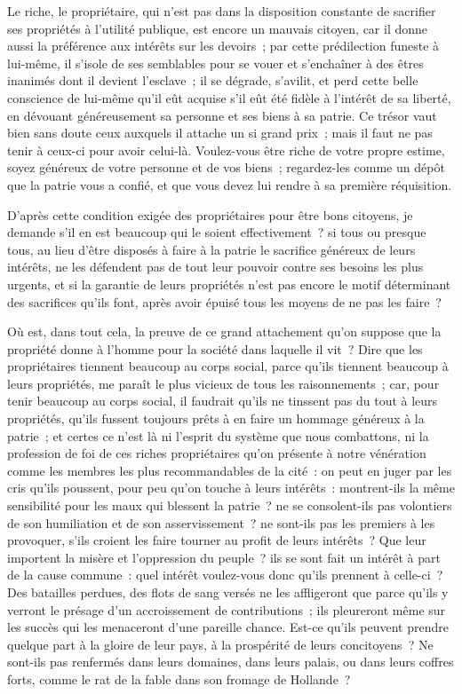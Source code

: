 \documentclass[french,twoside]{book} %
\begin{document}
Le riche, le propriétaire, qui n’est pas dans la disposition constante de sacrifier ses propriétés à l’utilité publique, est encore un mauvais citoyen, car il donne aussi la préférence aux intérêts sur les devoirs ; par cette prédilection funeste à lui-même, il s’isole de ses semblables pour se vouer et s’enchaîner à des êtres inanimés dont il devient l’esclave ; il se dégrade, s’avilit, et perd cette belle conscience de lui-même qu’il eût acquise s’il eût été fidèle à l’intérêt de sa liberté, en dévouant généreusement sa personne et ses biens à sa patrie. Ce trésor vaut bien sans doute ceux auxquels il attache un si grand prix ; mais il faut ne pas tenir à ceux-ci pour avoir celui-là. Voulez-vous être riche de votre propre estime, soyez généreux de votre personne et de vos biens ; regardez-les comme un dépôt que la patrie vous a confié, et que vous devez lui rendre à sa première réquisition.\par
D’après cette condition exigée des propriétaires pour être bons citoyens, je demande s’il en est beaucoup qui le soient effectivement ? si tous ou presque tous, au lieu d’être disposés à faire à la patrie le sacrifice généreux de leurs intérêts, ne les défendent pas de tout leur pouvoir contre ses besoins les plus urgents, et si la garantie de leurs propriétés n’est pas encore le motif déterminant des sacrifices qu’ils font, après avoir épuisé tous les moyens de ne pas les faire ?\par
Où est, dans tout cela, la preuve de ce grand attachement qu’on suppose que la propriété donne à l’homme pour la société dans laquelle il vit ? Dire que les propriétaires tiennent beaucoup au corps social, parce qu’ils tiennent beaucoup à leurs propriétés, me paraît le plus vicieux de tous les raisonnements ; car, pour tenir beaucoup au corps social, il faudrait qu’ils ne tinssent pas du tout à leurs propriétés, qu’ils fussent toujours prêts à en faire un hommage généreux à la patrie ; et certes ce n’est là ni l’esprit du système que nous combattons, ni la profession de foi de ces riches propriétaires qu’on présente à notre vénération comme les membres les plus recommandables de la cité : on peut en juger par les cris qu’ils poussent, pour peu qu’on touche à leurs intérêts : montrent-ils la même sensibilité pour les maux qui blessent la patrie ? ne se consolent-ils pas volontiers de son humiliation et de son asservissement ? ne sont-ils pas les premiers à les provoquer, s’ils croient les faire tourner au profit de leurs intérêts ? Que leur importent la misère et l’oppression du peuple ? ils se sont fait un intérêt à part de la cause commune : quel intérêt voulez-vous donc qu’ils prennent à celle-ci ? Des batailles perdues, des flots de sang versés ne les affligeront que parce qu’ils y verront le présage d’un accroissement de contributions ; ils pleureront même sur les succès qui les menaceront d’une pareille chance. Est-ce qu’ils peuvent prendre quelque part à la gloire de leur pays, à la prospérité de leurs concitoyens ? Ne sont-ils pas renfermés dans leurs domaines, dans leurs palais, ou dans leurs coffres forts, comme le rat de la fable dans son fromage de Hollande ?\par
\end{document}
